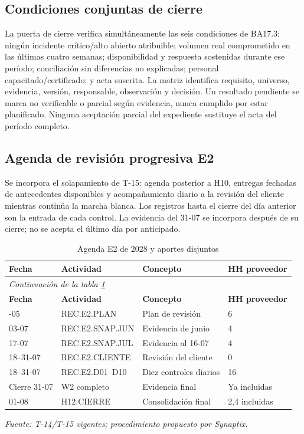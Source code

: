 \subsection{Condiciones conjuntas de cierre}
La puerta de cierre verifica simultáneamente las seis condiciones de BA17.3: ningún incidente crítico/alto abierto atribuible; volumen real comprometido en las últimas cuatro semanas; disponibilidad y respuesta sostenidas durante ese período; conciliación sin diferencias no explicadas; personal capacitado/certificado; y acta suscrita. La matriz identifica requisito, universo, evidencia, versión, responsable, observación y decisión. Un resultado pendiente se marca no verificable o parcial según evidencia, nunca cumplido por estar planificado. Ninguna aceptación parcial del expediente sustituye el acta del período completo.

\subsection{Agenda de revisión progresiva E2}
Se incorpora el solapamiento de T-15: agenda posterior a H10, entregas fechadas de antecedentes disponibles y acompañamiento diario a la revisión del cliente mientras continúa la marcha blanca. Los registros hasta el cierre del día anterior son la entrada de cada control. La evidencia del 31-07 se incorpora después de su cierre; no se acepta el último día por anticipado.

\begingroup\small\setlength{\tabcolsep}{3pt}
\begin{longtable}{p{}p{}p{}p{}}
\caption{Agenda E2 de 2028 y aportes disjuntos}\label{tab:t18-agenda}\\\hline
\textbf{Fecha} & \textbf{Actividad} & \textbf{Concepto} & \textbf{HH proveedor}\\\hline\endfirsthead
\multicolumn{4}{l}{\textit{Continuación de la tabla \ref{tab:t18-agenda}}}\\\hline
\textbf{Fecha} & \textbf{Actividad} & \textbf{Concepto} & \textbf{HH proveedor}\\\hline\endhead
\hline\endfoot\hline\endlastfoot
24-05 & REC.E2.PLAN & Plan de revisión & 6\\\hline
03-07 & REC.E2.SNAP.JUN & Evidencia de junio & 4\\\hline
17-07 & REC.E2.SNAP.JUL & Evidencia al 16-07 & 4\\\hline
18--31-07 & REC.E2.CLIENTE & Revisión del cliente & 0\\\hline
18--31-07 & REC.E2.D01--D10 & Diez controles diarios & 16\\\hline
Cierre 31-07 & W2 completo & Evidencia final & Ya incluidas\\\hline
01-08 & H12.CIERRE & Consolidación final & 2,4 incluidas\\\hline
\end{longtable}\endgroup
\noindent\textit{Fuente: T-14/T-15 vigentes; procedimiento propuesto por Synaptix.}

